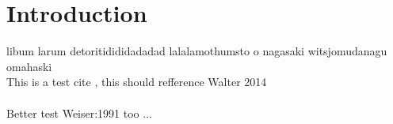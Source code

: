 \section{Introduction}
libum larum detoritidididadadad lalalamothumsto o nagasaki witsjomudanagu omahaski \\
This is a test cite \cite{Walter:2014}, this should refference Walter 2014
\\\\
Better test Weiser:1991 too \cite{Weiser:1991} ...